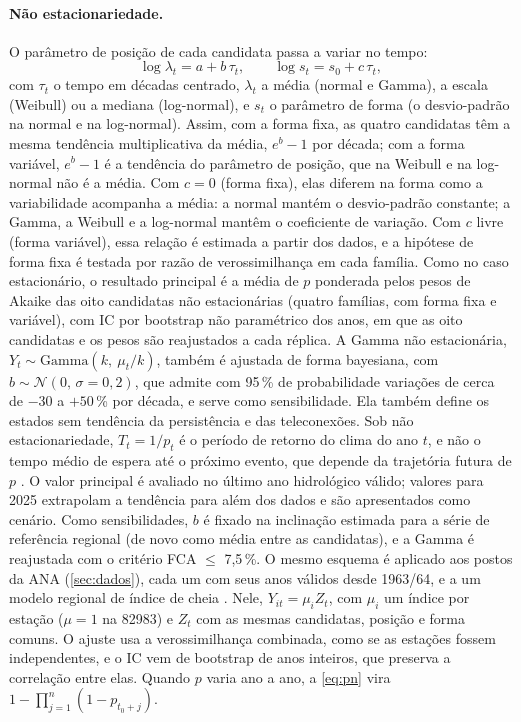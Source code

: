 \documentclass[11pt,a4paper]{article}
\newcommand{\Est}{82983}
\begin{document}
\paragraph{Não estacionariedade.} O parâmetro de posição de cada candidata passa a variar no
tempo:
\begin{equation}
  \log \lambda_t = a + b\,\tau_t, \qquad \log s_t = s_0 + c\,\tau_t,
\end{equation}
com $\tau_t$ o tempo em décadas centrado, $\lambda_t$ a média (normal e Gamma), a escala
(Weibull) ou a mediana (log-normal), e $s_t$ o parâmetro de forma (o desvio-padrão na normal e
na log-normal). Assim, com a forma fixa, as quatro candidatas têm a mesma tendência multiplicativa
da média, $e^{b}-1$ por década; com a forma variável, $e^{b}-1$ é a tendência do parâmetro de
posição, que na Weibull e na log-normal não é a média. Com $c = 0$ (forma fixa), elas diferem na forma como a variabilidade acompanha a média:
a normal mantém o desvio-padrão constante; a Gamma, a Weibull e a log-normal mantêm o coeficiente
de variação. Com $c$ livre (forma variável), essa relação é estimada a partir dos dados, e a
hipótese de forma fixa é testada por razão de verossimilhança em cada família. Como no caso
estacionário, o resultado principal é a média de $p$ ponderada pelos pesos de Akaike das oito
candidatas não estacionárias (quatro famílias, com forma fixa e variável), com IC por bootstrap
não paramétrico dos anos, em que as oito candidatas e os pesos são reajustados a cada réplica. A Gamma não estacionária,
$Y_t \sim \mathrm{Gamma}(k,\ \mu_t/k)$, também é ajustada de forma bayesiana, com
$b \sim \mathcal N(0,\,\sigma = 0{,}2)$, que admite com 95\,\% de probabilidade variações de cerca de
$-30$ a $+50$\,\% por década, e serve
como sensibilidade. Ela também define os estados sem tendência da persistência e das
teleconexões. Sob não estacionariedade, $T_t = 1/p_t$ é o período de retorno do clima do
ano $t$, e não o tempo médio de espera até o próximo evento, que depende da trajetória futura de
$p$ \parencite{salas2014}. O valor principal é avaliado no último ano hidrológico válido; valores para 2025
extrapolam a tendência para além dos dados e são apresentados como cenário. Como sensibilidades,
$b$ é fixado na inclinação estimada para a série de referência regional (de novo como média entre
as candidatas), e a Gamma é reajustada com o critério FCA $\le$ 7,5\,\%. O mesmo esquema é aplicado aos postos
da ANA (\cref{sec:dados}), cada um com seus anos válidos desde 1963/64, e a um modelo regional de
índice de cheia \parencite{hosking1997}. Nele, $Y_{it} = \mu_i Z_t$, com $\mu_i$ um índice por estação
($\mu = 1$ na \Est{}) e $Z_t$ com as mesmas candidatas, posição e forma comuns. O ajuste usa a
verossimilhança combinada, como se as estações fossem independentes, e o IC vem de bootstrap de
anos inteiros, que preserva a correlação entre elas. Quando $p$ varia ano a
ano, a \cref{eq:pn} vira $1-\prod_{j=1}^{n}(1-p_{t_0+j})$.
\end{document}
